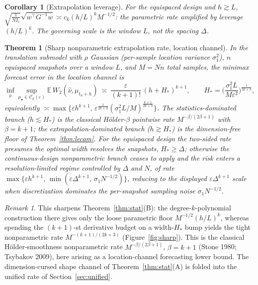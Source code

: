 \documentclass[11pt]{article}
\newtheorem{theorem}{Theorem}
\newtheorem{corollary}{Corollary}
\theoremstyle{definition}
\theoremstyle{remark}
\newtheorem{remark}{Remark}
\newcommand{\E}{\mathbb{E}}
\newcommand{\Ck}{\mathcal{C}_k(\varepsilon)}
\begin{document}
\begin{corollary}[Extrapolation leverage]\label{cor:leverage}
For the equispaced design and $h\gtrsim L$, $\sqrt{\frac1{N I_e}}\sqrt{w^\top G^{-1}w}
\asymp c_k(h/L)^{k}M^{-1/2}$: the parametric rate amplified by leverage $(h/L)^k$. The
governing scale is the window $L$, not the spacing $\Delta$.
\end{corollary}

\begin{theorem}[Sharp nonparametric extrapolation rate, location channel]\label{thm:sharp}
In the translation submodel with $\rho$ Gaussian (per-sample location variance
$\sigma_1^2$), $n$ equispaced snapshots over a window $L$, and $M=Nn$ total samples, the
minimax forecast error in the location channel is
\[
  \inf_{\hat\nu}\sup_{\mu_\bullet\in\Ck}\E\,W_2(\hat\nu,\mu_{t_n+h})
  \ \asymp\ \frac{\varepsilon}{(k+1)!}\,(h+H_*)^{k+1},
  \qquad
  H_*=\Big(\frac{\sigma_1^2 L}{M\varepsilon^2}\Big)^{\!\frac{1}{2k+3}},
\]
equivalently $\asymp\max\{\varepsilon h^{k+1},\,
\varepsilon^{\frac1{2k+3}}(\sigma_1^2 L/M)^{\frac{k+1}{2k+3}}\}$. The statistics-dominated
branch ($h\lesssim H_*$) is the classical H\"older-$\beta$ pointwise rate
$M^{-\beta/(2\beta+1)}$ with $\beta=k+1$; the extrapolation-dominated branch
($h\gtrsim H_*$) is the dimension-free floor of Theorem~\ref{thm:lecam}. For the equispaced design the
two-sided rate presumes the optimal width resolves the snapshots, $H_*\ge\Delta$; otherwise the
continuous-design nonparametric branch ceases to apply and the risk enters a resolution-limited regime
controlled by $\Delta$ and $N$, of rate
$\max\{\varepsilon h^{k+1},\,\min(\varepsilon\Delta^{k+1},\,\sigma_1 N^{-1/2})\}$, reducing to the
displayed $\varepsilon\Delta^{k+1}$ scale when discretization dominates the per-snapshot sampling noise
$\sigma_1 N^{-1/2}$.
\end{theorem}
\begin{remark}
This sharpens Theorem~\ref{thm:stat}(B): the degree-$k$-polynomial construction there gives
only the loose parametric floor $M^{-1/2}(h/L)^k$, whereas spending the $(k{+}1)$-st
derivative budget on a width-$H_*$ bump yields the tight nonparametric rate
$M^{-(k+1)/(2k+3)}$ (Figure~\ref{fig:sharp}). This is the classical H\"older-smoothness
nonparametric rate $M^{-\beta/(2\beta+1)}$, $\beta=k+1$ (Stone 1980; Tsybakov 2009), here
arising as a location-channel forecasting lower bound. The dimension-cursed shape channel of
Theorem~\ref{thm:stat}(A) is folded into the unified rate of Section~\ref{sec:unified}.
\end{remark}
\end{document}
